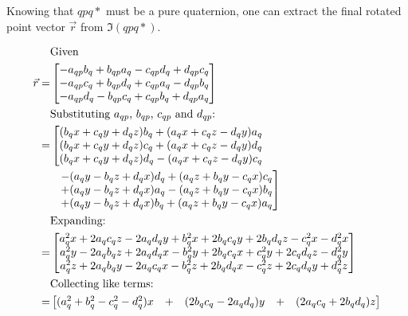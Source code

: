 \documentclass[12pt, a4paper]{article}
\begin{document}
Knowing that $qpq*$ must be a pure quaternion, one can extract the final rotated
point vector $\vec{r}$ from $\Im(qpq*)$.

\begin{align*}
    &\text{Given} \\
    \vec{r} = &\begin{bmatrix}
        - a_{qp}b_q + b_{qp}a_q - c_{qp}d_q + d_{qp}c_q \\
        - a_{qp}c_q + b_{qp}d_q + c_{qp}a_q - d_{qp}b_q \\
        - a_{qp}d_q - b_{qp}c_q + c_{qp}b_q + d_{qp}a_q
    \end{bmatrix} \\
    &\text{Substituting $a_{qp}$, $b_{qp}$, $c_{qp}$ and $d_{qp}$:} \\
    =&\left[\begin{matrix}
        (b_qx + c_qy + d_qz)b_q + (a_qx + c_qz - d_qy)a_q \\
        (b_qx + c_qy + d_qz)c_q + (a_qx + c_qz - d_qy)d_q \\
        (b_qx + c_qy + d_qz)d_q - (a_qx + c_qz - d_qy)c_q
    \end{matrix}\right.\\
    &\hspace{0.24cm}
    \left.\begin{matrix}
        - (a_qy - b_qz + d_qx)d_q + (a_qz + b_qy - c_qx )c_q \\
        + (a_qy - b_qz + d_qx)a_q - (a_qz + b_qy - c_qx )b_q \\
        + (a_qy - b_qz + d_qx)b_q + (a_qz + b_qy - c_qx )a_q
    \end{matrix}\right] \\
    &\text{Expanding:} \\
    = &\begin{bmatrix}
        a_q^2 x + 2 a_q c_q z - 2 a_q d_q y + b_q^2 x + 2 b_q c_q y + 2 b_q d_q z - c_q^2 x - d_q^2 x \\
        a_q^2 y - 2 a_q b_q z + 2 a_q d_q x - b_q^2 y + 2 b_q c_q x + c_q^2 y + 2 c_q d_q z - d_q^2 y \\
        a_q^2 z + 2 a_q b_q y - 2 a_q c_q x - b_q^2 z + 2 b_q d_q x - c_q^2 z + 2 c_q d_q y + d_q^2 z
    \end{bmatrix} \\
    &\text{Collecting like terms:} \\
    = &\begin{bmatrix}
        (a_q^2 + b_q^2 - c_q^2 - d_q^2)x &+& (2 b_q c_q - 2 a_q d_q)y &+& (2 a_q c_q + 2 b_q d_q)z \\

\end{bmatrix}
\end{align*}
\end{document}
